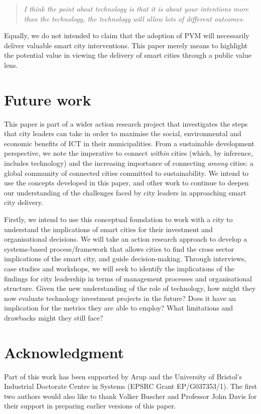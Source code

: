 \documentclass[conference]{IEEEtran}
\begin{document}
\begin{quote}
{\emph{I think the point about technology is that it is about your
intentions more than the technology, the technology will allow lots of
different outcomes.}}~\cite{doody:2012}
\end{quote}

Equally, we do not intended to claim that the adoption of PVM will
necessarily deliver valuable smart city interventions. This paper
merely means to highlight the potential value in viewing the delivery
of smart cities through a public value lens.

\section{Future work}
This paper is part of a wider action research project that
investigates the steps that city leaders can take in order to maximise
the social, environmental and economic benefits of ICT in their
municipalities. From a sustainable development perspective, we note
the imperative to connect {\emph{within}} cities (which, by inference,
includes technology) and the increasing importance of connecting
{\emph{among}} cities: a global community of connected cities
committed to sustainability. We intend to use the concepts developed
in this paper, and other work to continue to deepen our understanding
of the challenges faced by city leaders in approaching smart city
delivery.

Firstly, we intend to use this conceptual foundation to work with a
city to understand the implications of smart cities for their
investment and organisational decisions. We will take an action
research approach to develop a systems-based process/framework that
allows cities to find the cross sector implications of the smart city,
and guide decision-making.  Through interviews, case studies and
workshops, we will seek to identify the implications of the findings
for city leadership in terms of management processes and
organisational structure. Given the new understanding of the role of
technology, how might they now evaluate technology investment projects
in the future? Does it have an implication for the metrics they are
able to employ? What limitations and drawbacks might they still face?

\section*{Acknowledgment}
Part of this work has been supported by Arup and the University of
Bristol's Industrial Doctorate Centre in Systems (EPSRC Grant
EP/G037353/1). The first two authors would also like to thank Volker
Buscher and Professor John Davis for their support in preparing earlier
versions of this paper.
\end{document}
